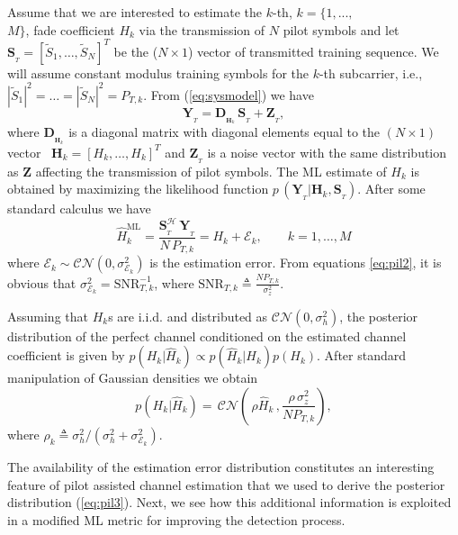 \documentclass{article}
\def\Yb{{\mathbf Y}}
\def\Sb{{\mathbf S}}
\def\Hb{{\mathbf H}}
\def\Zb{{\mathbf Z}}
\def\Hh{{\widehat H}}
\begin{document}
Assume that we are interested to estimate the $k$-th, $k=\{ 1, ...,$\\$M\}$, fade coefficient $H_k$ via the transmission of $N$ pilot symbols and let $\Sb_{_T}=[\tilde{S}_1,\ldots,\tilde{S}_N]^T$ be the ($N\times1$) vector of transmitted training sequence. We will assume constant modulus training symbols for the $k$-th subcarrier, i.e., $|\tilde{S}_1|^2 = \ldots=|\tilde{S}_N|^2=P_{T,k}$. From (\ref{eq:sysmodel}) we have 
\begin{equation} 
\label{eq:pil1}
             \Yb_{_T} = \mathbf{D}_{_{\Hb_k}} \, \Sb_{_T} + \Zb_{_T}, 
\end{equation}         
where $\mathbf{D}_{_{\Hb_k}}$ is a diagonal matrix with diagonal elements equal to the $(N \times 1)$ vector \, $\Hb_k = [H_k, \ldots, H_k]^T$ and $\Zb_{_T}$ is a noise vector with the same distribution as $\Zb$ affecting the transmission of pilot symbols. The ML estimate of $H_k$ is obtained by maximizing the likelihood function $p\,(\Yb_{_T}|\Hb_k,\Sb_{_T})$. After some standard calculus we have
\begin{equation}
\label{eq:pil2}
            {\Hh}^{\mathrm{ML}}_k = \frac{\Sb_{_T}^\mathcal{H} \, \Yb_{_T}}{N \, P_{T,k} }=H_k + \mathcal{E}_k, \quad \quad k=1,\ldots,M
\end{equation}
where $\mathcal{E}_k\sim \mathcal{CN}(0,{\sigma}^2_{\mathcal{E}_k})$ is the estimation error. 
From equations \eqref{eq:pil2}, it is obvious that $\sigma^2_{\mathcal{E}_k}=\mathrm{SNR}_{T,k}^{-1}$, where $\mathrm{SNR}_{T,k}\triangleq \frac{N P_{T,k}}{\sigma^2_z}$.

Assuming that $H_k$s are i.i.d. and distributed as $\mathcal{CN}(0,\sigma^2_h)$, the posterior distribution of the perfect channel conditioned on the estimated channel coefficient is given by $p(H_k|\Hh_k)\propto p(\Hh_k|H_k) p(H_k)$.  
After standard manipulation of Gaussian densities we obtain 
\begin{equation}
\label{eq:pil3}
      p(H_k|\Hh_k) = \, \mathcal{CN}\left(\,\rho \Hh_k \,,\frac{\rho \,{\sigma}^2_z}{N P_{T,k}}\right),
\end{equation}
where $\rho_k \triangleq \sigma^2_h /({\sigma}^2_h + \sigma^2_{\mathcal{E}_k} )$.

The availability of the estimation error distribution constitutes an interesting feature of pilot assisted channel estimation that we used to derive the posterior distribution (\ref{eq:pil3}). Next, we see how this additional information is exploited in a modified ML metric for improving the detection process.  
\end{document}
